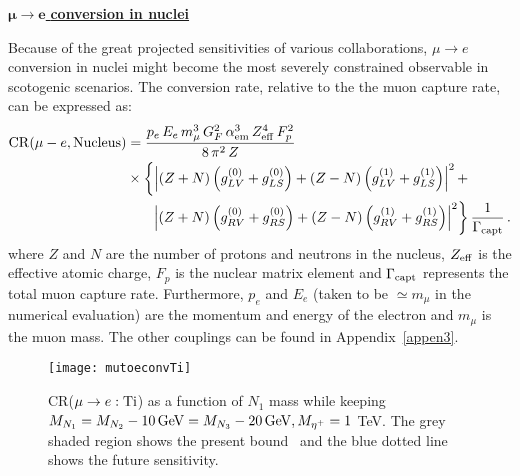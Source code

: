 \documentclass[prd,nofootinbib,preprint,superscriptaddress]{revtex4}
\begin{document}
\underline{ $\pmb{\mu\to e}$ \bf{conversion in nuclei}}



	Because of the great projected sensitivities of various collaborations,  
	$\mu \to e$ conversion in nuclei might become the most severely constrained observable in scotogenic scenarios.
The conversion rate, relative to the
the muon capture rate, can be expressed as:
\begin{align}
	{\rm CR} (\mu- e, {\rm Nucleus}) &= 
	\frac{p_e \, E_e \, m_\mu^3 \, G_F^2 \, \alpha_{\mathrm{em}}^3 
		\, Z_{\rm eff}^4 \, F_p^2}{8 \, \pi^2 \, Z}  \nonumber \\
	&\times \left\{ \left| (Z + N) \left( g_{LV}^{(0)} + g_{LS}^{(0)} \right) + 
	(Z - N) \left( g_{LV}^{(1)} + g_{LS}^{(1)} \right) \right|^2 + 
	\right. \nonumber \\
	& \ \ \ 
	\ \left. \,\, \left| (Z + N) \left( g_{RV}^{(0)} + g_{RS}^{(0)} \right) + 
	(Z - N) \left( g_{RV}^{(1)} + g_{RS}^{(1)} \right) \right|^2 \right\} 
	\frac{1}{\Gamma_{\rm capt}}\,.
\end{align}
where $Z$ and $N$ are the number of protons and neutrons in the nucleus, $Z_{\rm eff}$ is the effective atomic
charge, $F_p$ is the nuclear matrix element and $\Gamma_{\rm capt}$ represents the total muon capture rate. Furthermore, $p_e$ and $E_e$ (taken to be $\simeq m_\mu$ in the numerical evaluation) are
the momentum and energy of the electron and $m_\mu$ is the muon mass. The other couplings can be found in Appendix~\ref{appen3}.
\begin{figure}[h!]
	\centering
	\texttt{[image: mutoeconvTi]}
	\caption{CR($\mu \to e : {\rm Ti}$) as a function of $N_1$ mass while keeping $M_{N_1}=M_{N_2}-10 \, {\rm GeV} = M_{N_3}-20 \, {\rm GeV}, M_{\eta^+} = 1$ TeV. The grey shaded region shows the present bound~\cite{SINDRUMII:1993gxf} and the blue dotted line shows the future sensitivity.~\cite{Baldini:2018uhj}}
	\label{mutoeconv}
\end{figure}
\end{document}
